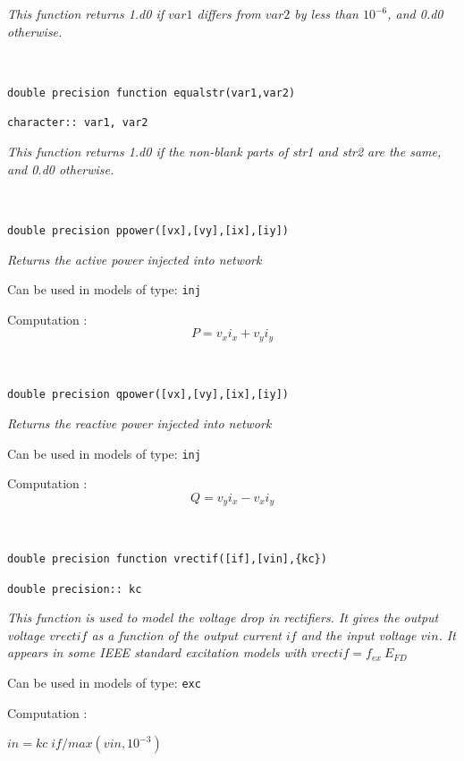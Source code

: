 {\it This function returns 1.d0 if $var1$ differs from $var2$ by less than $10^{-6}$, and 0.d0 otherwise.

~ \hrulefill ~

{\large \tt double precision function equalstr(var1,var2)}

\hspace*{10ex} {\tt character:: var1, var2}

{\it This function returns 1.d0 if the non-blank parts of str1 and str2 are the same,  and 0.d0  otherwise.


~ \hrulefill ~

{\large \tt double precision ppower([vx],[vy],[ix],[iy])}

{\it Returns the active power injected into network}

Can be used in models of type: {\tt inj}

Computation : 
\[ P = v_x i_x + v_y i_y \]

~ \hrulefill ~
 
{\large \tt double precision qpower([vx],[vy],[ix],[iy])}

{\it Returns the reactive power injected into network}

Can be used in models of type: {\tt inj}

Computation : 
\[ Q = v_y i_x - v_x i_y \]
 
~ \hrulefill ~

{\large \tt double precision function vrectif([if],[vin],\{kc\})}

\hspace*{10ex} {\tt double precision:: kc}

{\it This function is used to model the voltage drop in rectifiers. It gives the output voltage $vrectif$ as a function of the output current $if$ and the input voltage $vin$. It appears in some IEEE standard excitation models with $vrectif= f_{ex} \: E_{FD}$}

Can be used in models of type: {\tt exc}

Computation : 

\hspace*{20ex}\begin{minipage}[t]{15cm}
\begin{algorithmic} 
\STATE $in=kc \; if / max(vin, 10^{-3})$


\end{algorithmic}
\end{minipage}}}

